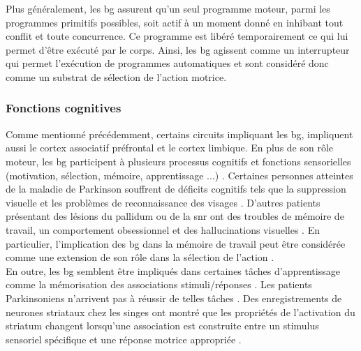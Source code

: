 Plus généralement, les \gls{bg} assurent qu'un seul programme moteur, parmi les programmes primitifs possibles, soit actif à un moment donné en inhibant tout conflit et toute concurrence. Ce programme est libéré temporairement ce qui lui permet d'être exécuté par le corps. Ainsi, les \gls{bg} agissent comme un interrupteur qui permet l'exécution de programmes automatiques et sont considéré donc comme un substrat de sélection de l'action motrice\cite{Kropotov:1999,Mink:1996,Redgrave:1999, Prescott:2007,Gurney:2001a, Frank:2005}. \\

\subsubsection{Fonctions cognitives}

Comme mentionné précédemment, certains circuits impliquant les \gls{bg}, impliquent aussi le cortex associatif préfrontal et le cortex limbique. En plus de son rôle moteur, les \gls{bg} participent à plusieurs processus cognitifs et fonctions sensorielles (motivation, sélection, mémoire, apprentissage ...) \cite{Berns:1996,Redgrave:1999}. Certaines personnes atteintes de la maladie de Parkinson souffrent de déficits cognitifs tels que la suppression visuelle et les problèmes de reconnaissance des visages \cite{Jacobs:1995}. D'autres patients présentant des lésions du pallidum ou de la \gls{snr} ont des troubles de mémoire de travail, un comportement obsessionnel et des hallucinations visuelles \cite{Laplane:1989}. En particulier, l'implication des \gls{bg} dans la mémoire de travail peut être considérée comme une extension de son rôle dans la sélection de l'action \cite{Prescott:2003, Kawagoe:1998}. \\

En outre, les \gls{bg} semblent être impliqués dans certaines tâches d'apprentissage comme la mémorisation des associations stimuli/réponses \cite{Hikosaka:1998, Perez:2001}. Les patients Parkinsoniens n'arrivent pas à réussir de telles tâches \cite{Knowlton:1996}.  Des enregistrements de neurones striataux chez les singes ont montré que les propriétés de l'activation du striatum changent lorsqu'une association est construite entre un stimulus sensoriel spécifique et une réponse motrice appropriée \cite{Aosaki:1994}.\\


